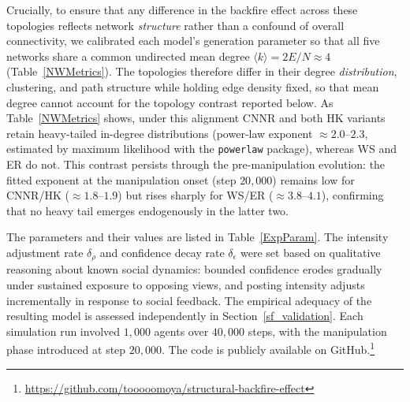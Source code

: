 \documentclass[pdflatex,sn-mathphys-num]{sn-jnl}%
\theoremstyle{thmstyleone}%
\theoremstyle{thmstyletwo}%
\theoremstyle{thmstylethree}%
\def\post{\rho} %
\def\BoundedConfidence{\epsilon}
\begin{document}
Crucially, to ensure that any difference in the backfire effect across these
topologies reflects network \emph{structure} rather than a confound of overall
connectivity, we calibrated each model's generation parameter so that all five
networks share a common undirected mean degree $\langle k\rangle = 2E/N \approx 4$
(Table~\ref{NWMetrics}). The topologies therefore differ in their degree
\emph{distribution}, clustering, and path structure while holding edge density
fixed, so that mean degree cannot account for the topology contrast reported
below. As Table~\ref{NWMetrics} shows, under this alignment CNNR and both HK
variants retain heavy-tailed in-degree distributions (power-law exponent
$\approx 2.0$--$2.3$, estimated by maximum likelihood with the \texttt{powerlaw}
package), whereas WS and ER do not. This contrast persists through the
pre-manipulation evolution: the fitted exponent at the manipulation onset
(step $20{,}000$) remains low for CNNR/HK ($\approx 1.8$--$1.9$) but rises
sharply for WS/ER ($\approx 3.8$--$4.1$), confirming that no heavy tail
emerges endogenously in the latter two.
\par


The parameters and their values are listed in Table~\ref{ExpParam}.
The intensity adjustment rate $\delta_{\post}$ and confidence decay rate $\delta_{\BoundedConfidence}$ were set based on qualitative reasoning about known social dynamics: bounded confidence erodes gradually under sustained exposure to opposing views, and posting intensity adjusts incrementally in response to social feedback. The empirical adequacy of the resulting model is assessed independently in Section~\ref{sf_validation}.
Each simulation run involved $1{,}000$ agents over $40{,}000$ steps,
with the manipulation phase introduced at step $20{,}000$.
The code is publicly available on GitHub.\footnote{\url{https://github.com/tooooomoya/structural-backfire-effect}}
\par
\end{document}
